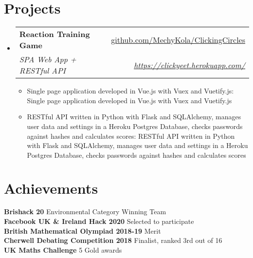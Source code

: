 \documentclass[a4paper,11pt]{article}
\makeatletter
\def \ifempty#1{\def\temp{#1} \ifx\temp\empty }
\newcommand{\resumeItem}[2]{
  \item\small{
  	\ifempty{#1}#2\else\textbf{#1}{: #2 \vspace{-2pt}}\fi
  }
}
\newcommand{\resumeSubheading}[4]{
  \vspace{-1pt}\item
    \begin{tabular*}{0.97\textwidth}{l@{\extracolsep{\fill}}r}
      \textbf{#1} & #2 \\
      \textit{\small#3} & \textit{\small #4} \\
    \end{tabular*}\vspace{-5pt}
}
\newcommand{\resumeSubHeadingListStart}{\begin{itemize}[leftmargin=*]}
\newcommand{\resumeSubHeadingListEnd}{\end{itemize}}
\newcommand{\resumeItemListStart}{\begin{itemize}}
\newcommand{\resumeItemListEnd}{\end{itemize}\vspace{-5pt}}
\makeatother
\begin{document}
\section{Projects}
  \resumeSubHeadingListStart
    \resumeSubheading
      {Reaction Training Game}{\href{https://github.com/MechyKola/ClickingCircles}
      {github.com/MechyKola/ClickingCircles}}
      {SPA Web App + RESTful API}{\href{https://clickyeet.herokuapp.com/}
      {https://clickyeet.herokuapp.com/}}
      \resumeItemListStart
        \resumeItem{}
          {Single page application developed in Vue.js with Vuex and Vuetify.js}
        \resumeItem{}
          {RESTful API written in Python with Flask and SQLAlchemy, manages user data and 
          settings in a Heroku Postgres Database, checks passwords against 
          hashes and calculates scores}
      \resumeItemListEnd
  \resumeSubHeadingListEnd


\section{Achievements}
  \textbf{Brishack 20}{ Environmental Category Winning Team} \\
  \textbf{Facebook UK \& Ireland Hack 2020}{ Selected to participate} \\
  \textbf{British Mathematical Olympiad 2018-19}{ Merit} \\
  \textbf{Cherwell Debating Competition 2018}{ Finalist, ranked 3rd out of 16} \\
  \textbf{UK Maths Challenge}{ 5 Gold  awards} \\
  
  
\end{document}
